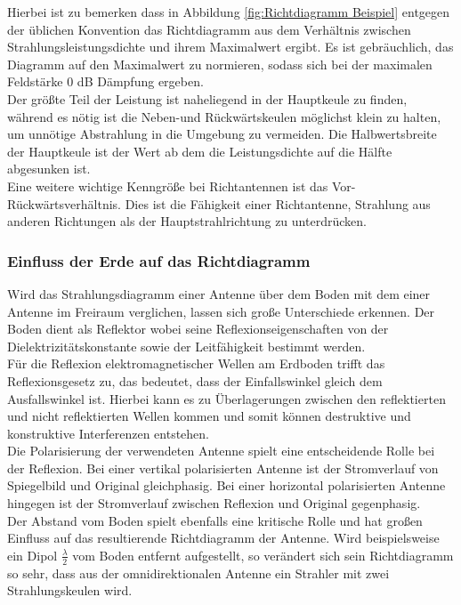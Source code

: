 \documentclass[12pt]{scrreprt}
\begin{document}
	Hierbei ist zu bemerken dass in Abbildung \ref{fig:Richtdiagramm Beispiel} entgegen der üblichen Konvention das Richtdiagramm aus dem Verhältnis zwischen Strahlungsleistungsdichte und ihrem Maximalwert ergibt. Es ist gebräuchlich, das Diagramm auf den Maximalwert zu normieren, sodass sich bei der maximalen Feldstärke 0 dB Dämpfung ergeben.\\
	
	Der größte Teil der Leistung ist naheliegend in der Hauptkeule zu finden, während es nötig ist die Neben-und Rückwärtskeulen möglichst klein zu halten, um unnötige Abstrahlung in die Umgebung zu vermeiden. Die Halbwertsbreite der Hauptkeule ist der Wert ab dem die Leistungsdichte auf die Hälfte abgesunken ist.\\
	
	Eine weitere wichtige Kenngröße bei Richtantennen ist das Vor-Rückwärtsverhältnis. Dies ist die Fähigkeit einer Richtantenne, Strahlung aus anderen Richtungen als der Hauptstrahlrichtung zu unterdrücken.
	
	\subsubsection{Einfluss der Erde auf das Richtdiagramm}
	Wird das Strahlungsdiagramm einer Antenne über dem Boden mit dem einer Antenne im Freiraum verglichen, lassen sich große Unterschiede erkennen. Der Boden dient als Reflektor wobei seine Reflexionseigenschaften von der Dielektrizitätskonstante sowie der Leitfähigkeit bestimmt werden.\\
	
	Für die Reflexion elektromagnetischer Wellen am Erdboden trifft das Reflexionsgesetz zu, das bedeutet, dass der Einfallswinkel gleich dem Ausfallswinkel ist. Hierbei kann es zu Überlagerungen zwischen den reflektierten und nicht reflektierten Wellen kommen und somit können destruktive und konstruktive Interferenzen entstehen.\\
	
	Die Polarisierung der verwendeten Antenne spielt eine entscheidende Rolle bei der Reflexion. Bei einer vertikal polarisierten Antenne ist der Stromverlauf von Spiegelbild und Original gleichphasig. Bei einer horizontal polarisierten Antenne hingegen ist der Stromverlauf zwischen Reflexion und Original gegenphasig.\\
	
	Der Abstand vom Boden spielt ebenfalls eine kritische Rolle und hat großen Einfluss auf das resultierende Richtdiagramm der Antenne. Wird beispielsweise ein Dipol $\frac{\lambda}{2}$ vom Boden entfernt aufgestellt, so verändert sich sein Richtdiagramm so sehr, dass aus der omnidirektionalen Antenne ein Strahler mit zwei Strahlungskeulen wird. 
	
\end{document}
